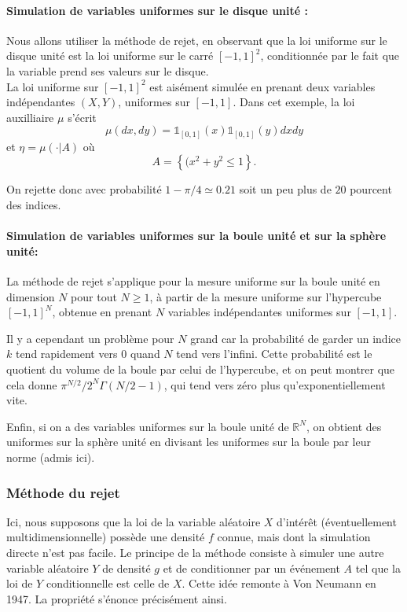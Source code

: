 \documentclass[a4paper,12pt]{book}
\begin{document}
\paragraph{Simulation de variables uniformes sur le disque unit\'e :}
Nous allons utiliser la m\'ethode de rejet, en observant que la loi uniforme sur le disque unit\'e est la loi uniforme sur le carr\'e $[-1,1]^2$, conditionn\'ee par le fait que la variable prend ses valeurs sur le disque. \\
La loi uniforme sur $[-1,1]^2$ est ais\'ement simul\'ee en prenant deux variables ind\'ependantes $(X,Y)$, uniformes sur $[-1,1]$.
Dans cet exemple, la loi auxilliaire $\mu$ s'écrit
$$\mu(dx,dy)=\mathds{1}_{[0,1]}(x) \mathds{1}_{[0,1]}(y) dx dy$$ et $\eta=\mu(\cdot |A)$ où
$$A=\left\{ (x^2+y^2\le 1\right\}.$$

On rejette donc avec probabilité $1-\pi/4\simeq0.21$ soit un peu plus de $20$ pourcent des indices.




\paragraph{Simulation de variables uniformes sur la boule unit\'e et sur la sph\`ere unit\'e:} La m\'ethode de rejet s'applique pour la mesure uniforme sur la boule unit\'e en dimension $N$ pour tout $N \geq 1$, \`a partir de la mesure uniforme sur l'hypercube $[-1,1]^N$, obtenue en prenant $N$ variables ind\'ependantes uniformes sur $[-1,1]$.


Il y a cependant un probl\`eme pour $N$ grand car la probabilit\'e de garder un indice $k$ tend rapidement vers $0$ quand $N$ tend vers l'infini. Cette probabilit\'e est le quotient du volume de la boule par celui de l'hypercube, et on peut montrer que cela donne $\pi^{N/2}/2^N\Gamma(N/2 - 1)$, qui tend vers z\'ero plus qu'exponentiellement vite.

Enfin, si on a des variables uniformes sur la boule unit\'e de $\mathbb{R}^N$, on obtient des uniformes sur la sph\`ere unit\'e en divisant les uniformes sur la boule par leur norme (admis ici).

\subsubsection{Méthode du rejet}
Ici, nous supposons que la loi de la variable aléatoire
$X$
d’intérêt (éventuellement
multidimensionnelle) possède une densité
$f$
connue, mais dont la simulation directe n’est pas facile. Le principe de la méthode consiste à simuler une autre variable aléatoire
$Y$
de densité
$g$
et de conditionner par un événement $A$ tel que la loi de $Y$ conditionnelle est celle de $X$. Cette idée remonte à Von Neumann en 1947. La propriété s’énonce précisément ainsi.
\end{document}
